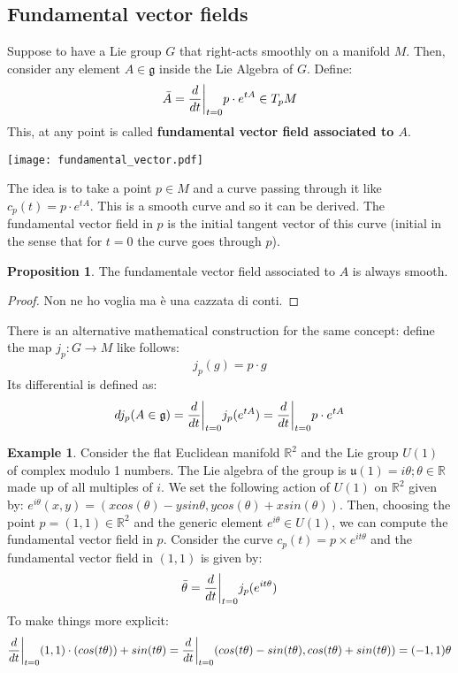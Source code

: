 \documentclass[12pt,a4paper]{report}
\theoremstyle{definition}
\theoremstyle{Theorem}
\newtheorem{Prop}[Def]{Proposition}
\theoremstyle{definition}
\newtheorem{Ex}[Def]{Example}
\theoremstyle{definition}
\begin{document}
		\subsection{Fundamental vector fields}
		Suppose to have a Lie group $G$ that right-acts smoothly on a manifold $M$. Then, consider any element $A\in\mathfrak{g}$ inside the Lie Algebra of $G$. Define:
		$$\bar{A}={d\over dt}\bigg|_{t=0}p\cdot e^{tA}\in T_pM$$
		This, at any point is called \textbf{fundamental vector field associated to $A$}.\\
		\begin{center}
			\texttt{[image: fundamental\_vector.pdf]}
		\end{center}
		The idea is to take a point $p\in M$ and a curve passing through it like $c_p(t)=p\cdot e^{tA}$. This is a smooth curve and so it can be derived. The fundamental vector field in $p$ is the initial tangent vector of this curve (initial in the sense that for $t=0$ the curve goes through $p$).
		\begin{Prop}
			The fundamentale vector field associated to $A$ is always smooth.
		\end{Prop}
		\begin{proof}
			Non ne ho voglia ma è una cazzata di conti.
		\end{proof}
		There is an alternative mathematical construction for the same concept: define the map $j_p:G\rightarrow M$ like follows:
		$$j_p(g)=p\cdot g$$
		Its differential is defined as:
		$$dj_p(A\in\mathfrak{g})={d\over dt}\bigg|_{t=0}j_p(e^{tA})={d\over dt}\bigg|_{t=0}p\cdot e^{tA}$$
		\begin{Ex}
			Consider the flat Euclidean manifold $\mathbb{R}^2$ and the Lie group $U(1)$ of complex modulo 1 numbers. The Lie algebra of the group is $\mathfrak{u}(1)={i\theta;\theta\in\mathbb{R}}$ made up of all multiples of $i$. We set the following action of $U(1)$ on $\mathbb{R}^2$ given by: $e^{i\theta}(x,y)=(xcos(\theta)-ysin\theta,ycos(\theta)+xsin(\theta))$.
			Then, choosing the point $p=(1,1)\in\mathbb{R}^2$ and the generic element $e^{i\theta}\in U(1)$, we can compute the fundamental vector field in $p$. Consider the curve $c_p(t)=p\times e^{it\theta}$ and the fundamental vector field in $(1,1)$ is given by:
			$$\bar{\theta}={d\over dt}\bigg|_{t=0}j_p(e^{it\theta})$$
			To make things more explicit:
			$${d\over dt}\bigg|_{t=0}(1,1)\cdot (cos(t\theta))+sin(t\theta)=
			{d\over dt}\bigg|_{t=0}(cos(t\theta)-sin(t\theta),cos(t\theta)+sin(t\theta))=(-1,1)\theta$$
		\end{Ex}
\end{document}
